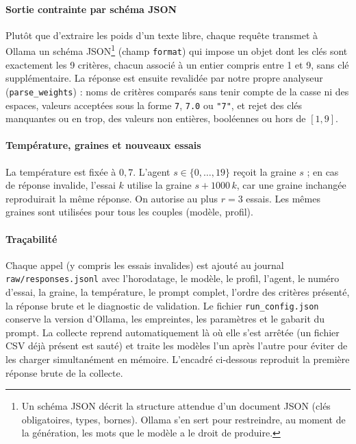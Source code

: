 \documentclass[11pt,a4paper]{article}
\newcommand{\code}[1]{\texttt{#1}}
\begin{document}
\paragraph{Sortie contrainte par schéma JSON} Plutôt que d'extraire les poids d'un texte libre, chaque requête transmet à Ollama un schéma JSON\footnote{Un schéma JSON décrit la structure attendue d'un document JSON (clés obligatoires, types, bornes). Ollama s'en sert pour restreindre, au moment de la génération, les mots que le modèle a le droit de produire.} (champ \code{format}) qui impose un objet dont les clés sont exactement les 9 critères, chacun associé à un entier compris entre 1 et 9, sans clé supplémentaire. La réponse est ensuite revalidée par notre propre analyseur (\code{parse\_weights}) : noms de critères comparés sans tenir compte de la casse ni des espaces, valeurs acceptées sous la forme \code{7}, \code{7.0} ou \code{"7"}, et rejet des clés manquantes ou en trop, des valeurs non entières, booléennes ou hors de $[1,9]$.

\paragraph{Température, graines et nouveaux essais} La température est fixée à $0{,}7$. L'agent $s\in\{0,\dots,19\}$ reçoit la graine $s$ ; en cas de réponse invalide, l'essai $k$ utilise la graine $s+1000\,k$, car une graine inchangée reproduirait la même réponse. On autorise au plus $r=3$ essais. Les mêmes graines sont utilisées pour tous les couples (modèle, profil).

\paragraph{Traçabilité} Chaque appel (y compris les essais invalides) est ajouté au journal \code{raw/responses.jsonl} avec l'horodatage, le modèle, le profil, l'agent, le numéro d'essai, la graine, la température, le prompt complet, l'ordre des critères présenté, la réponse brute et le diagnostic de validation. Le fichier \code{run\_config.json} conserve la version d'Ollama, les empreintes, les paramètres et le gabarit du prompt. La collecte reprend automatiquement là où elle s'est arrêtée (un fichier CSV déjà présent est sauté) et traite les modèles l'un après l'autre pour éviter de les charger simultanément en mémoire. L'encadré ci-dessous reproduit la première réponse brute de la collecte.
\end{document}

